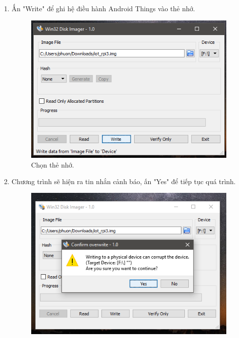 \begin{enumerate}
\item Ấn "Write" để ghi hệ điều hành Android Things vào thẻ nhớ.
\begin{center}
\begin{figure}[htp]
\begin{center}
\includegraphics[scale=0.67]{image3/buoc2cach1s11.png}
\end{center}
\caption{Chọn thẻ nhớ.}
\label{refhinh1}
\end{figure}
\end{center}
\item Chương trình sẽ hiện ra tin nhắn cảnh báo, ấn "Yes" để tiếp tục quá trình.
\begin{center}
\begin{figure}[htp]
\begin{center}
\includegraphics[scale=0.65]{image3/buoc2cach1s12.png}

\end{center}
\end{figure}
\end{center}
\end{enumerate}
